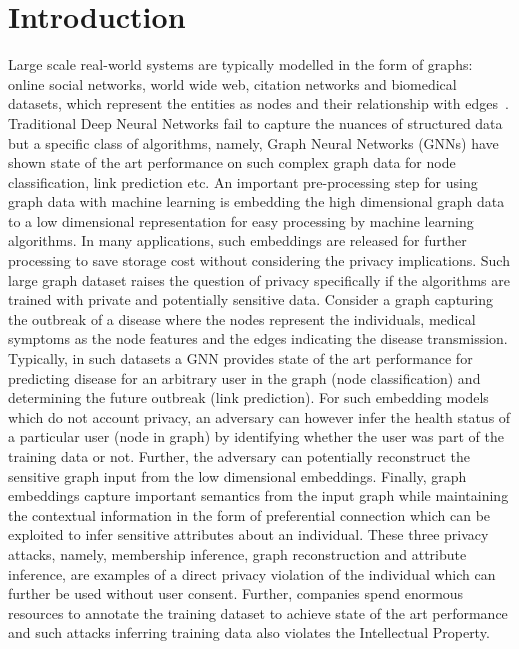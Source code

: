 \section{Introduction}\label{introduction}


Large scale real-world systems are typically modelled in the form of graphs: online social networks, world wide web, citation networks and biomedical datasets, which represent the entities as nodes and their relationship with edges~\cite{zhou2018graph}.
Traditional Deep Neural Networks fail to capture the nuances of structured data but a specific class of algorithms, namely, Graph Neural Networks (GNNs) have shown state of the art performance on such complex graph data for node classification, link prediction etc.
An important pre-processing step for using graph data with machine learning is embedding the high dimensional graph data to a low dimensional representation for easy processing by machine learning algorithms.
In many applications, such embeddings are released for further processing to save storage cost without considering the privacy implications.
Such large graph dataset raises the question of privacy specifically if the algorithms are trained with private and potentially sensitive data.
Consider a graph capturing the outbreak of a disease where the nodes represent the individuals, medical symptoms as the node features and the edges indicating the disease transmission.
Typically, in such datasets a GNN provides state of the art performance for predicting disease for an arbitrary user in the graph (node classification) and determining the future outbreak (link prediction).
For such embedding models which do not account privacy, an adversary can however infer the health status of a particular user (node in graph) by identifying whether the user was part of the training data or not.
Further, the adversary can potentially reconstruct the sensitive graph input from the low dimensional embeddings. %
Finally, graph embeddings capture important semantics from the input graph while maintaining the contextual information in the form of preferential connection which can be exploited to infer sensitive attributes about an individual.
These three privacy attacks, namely, membership inference, graph reconstruction and attribute inference, are examples of a direct privacy violation of the individual which can further be used without user consent. %
Further, companies spend enormous resources to annotate the training dataset to achieve state of the art performance and such attacks inferring training data also violates the Intellectual Property.

